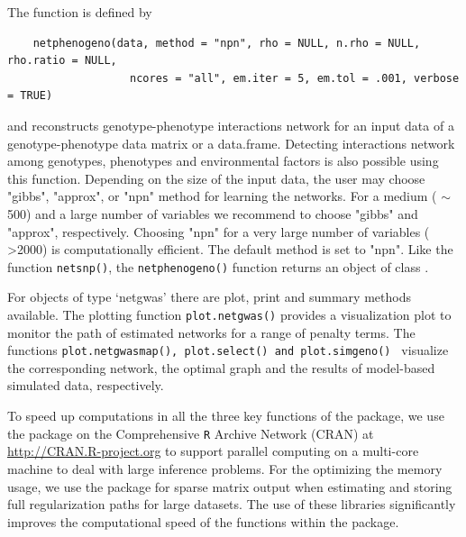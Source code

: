 The function is defined by
\begin{verbatim}
	netphenogeno(data, method = "npn", rho = NULL, n.rho = NULL, rho.ratio = NULL, 
	               ncores = "all", em.iter = 5, em.tol = .001, verbose = TRUE)
\end{verbatim}
and reconstructs genotype-phenotype interactions network for an input data of a genotype-phenotype data matrix or a data.frame. Detecting interactions network among genotypes, phenotypes and environmental factors is also possible using this function. Depending on the size of the input data, the user may choose "gibbs", "approx", or "npn" method for learning the networks. For a medium ( $\sim$500) and a large number of variables we recommend to choose "gibbs" and "approx", respectively. Choosing "npn" for a very large number of variables ( >2000) is computationally efficient. The default method is set to "npn". Like the function {\tt netsnp()}, the {\tt netphenogeno()} function returns an object of class . %


For objects of type  `netgwas' there are plot, print and summary methods available. The plotting function {\tt plot.netgwas()} provides a visualization plot to monitor the path of estimated networks for a range of penalty terms. The functions {\tt plot.netgwasmap(), {\tt plot.select()} and {\tt plot.simgeno()} } visualize the corresponding network, the optimal graph and the results of model-based simulated data, respectively. 

To speed up computations in all the three key functions of the  package, we use the  package on the Comprehensive {\tt R} Archive Network (CRAN) at \url{http://CRAN.R-project.org} to support parallel computing on a multi-core machine to deal with large inference problems. For the optimizing the memory usage, we use the  package \citep{Matrix} for sparse matrix output when estimating and storing full regularization paths for large datasets. The use of these libraries significantly improves the computational speed of the functions within the package.

